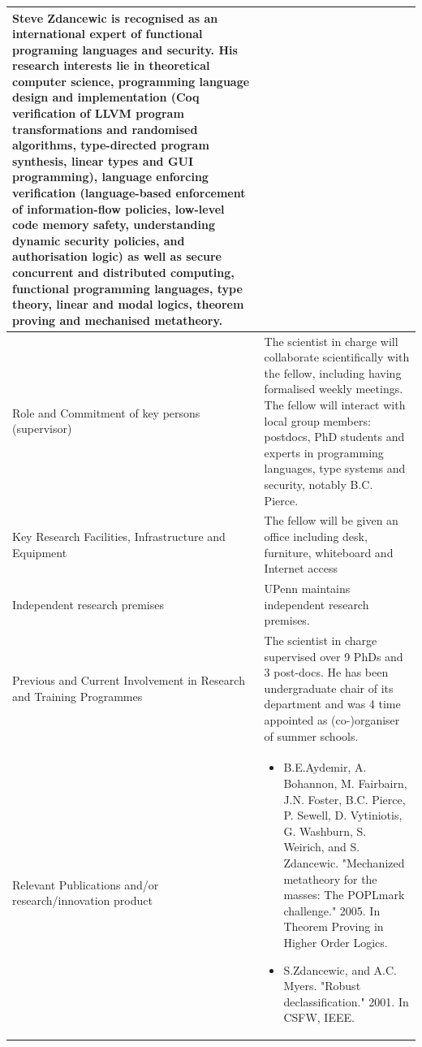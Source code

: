 \documentclass{article}[11pt]
\begin{document}
{\begin{tabular}{| l | l |}
{      Steve Zdancewic is recognised as an international expert of functional programing
      languages and security. His research interests lie in theoretical computer science, programming language design
      and implementation (Coq verification of LLVM program transformations and randomised algorithms, type-directed
      program synthesis, linear types and GUI programming), language enforcing verification (language-based enforcement
      of information-flow policies, low-level code memory safety, understanding dynamic security policies, and authorisation
      logic) as well as secure concurrent and distributed computing, functional programming languages, type theory, linear
      and modal logics, theorem proving and mechanised metatheory.
    }\\
    \hline
    \parbox[c]{4cm}{Role and Commitment of key persons (supervisor)} & \parbox[c]{14cm}{The scientist in charge will collaborate scientifically with the fellow, including having formalised weekly meetings. The fellow will interact with local group members:  postdocs, PhD students and experts in programming languages, type systems and security, notably B.C. Pierce.}\\
    \hline
    \parbox[c]{4cm}{Key  Research  Facilities,   Infrastructure and Equipment} & \parbox[c]{14cm}{The fellow will be given an office including desk, furniture, whiteboard and Internet access} \\
    \hline
    \parbox[c]{4cm}{Independent research premises} &  \parbox[c]{14cm}{UPenn maintains independent research premises.}\\
    \hline
    \parbox[c]{4cm}{Previous and Current Involvement in Research and Training Programmes} & \parbox[c]{14cm}{The scientist in charge supervised over 9 PhDs and 3 post-docs. He has been undergraduate chair of its department and was 4 time appointed as (co-)organiser of summer schools.} \\
    \hline
    \parbox[c]{4cm}{Relevant  Publications  and/or\\  research/innovation product} &
    \parbox[c]{14cm}{
      \begin{itemize}[leftmargin=0.5em, itemsep=0em]
      \item B.E.Aydemir,  A. Bohannon, M. Fairbairn, J.N. Foster, B.C. Pierce, P. Sewell, D. Vytiniotis, G. Washburn, S. Weirich, and S. Zdancewic. "Mechanized metatheory for the masses: The POPLmark challenge." 2005. In Theorem Proving in Higher Order Logics.
      \item S.Zdancewic, and A.C. Myers. "Robust declassification." 2001. In CSFW, IEEE.

\end{itemize}}
\end{tabular}}
\end{document}
